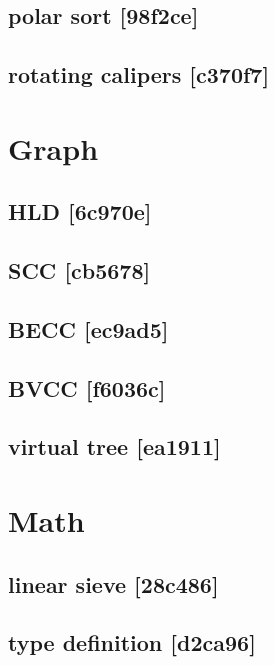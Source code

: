 \subsection{polar sort {\footnotesize [98f2ce]} }

\subsection{rotating calipers {\footnotesize [c370f7]} }


\section{Graph}
\subsection{HLD {\footnotesize [6c970e]} }

\subsection{SCC {\footnotesize [cb5678]} }

\subsection{BECC {\footnotesize [ec9ad5]} }

\subsection{BVCC {\footnotesize [f6036c]} }

\subsection{virtual tree {\footnotesize [ea1911]} }


\section{Math}
\subsection{linear sieve {\footnotesize [28c486]} }

\subsection{type definition {\footnotesize [d2ca96]} }


